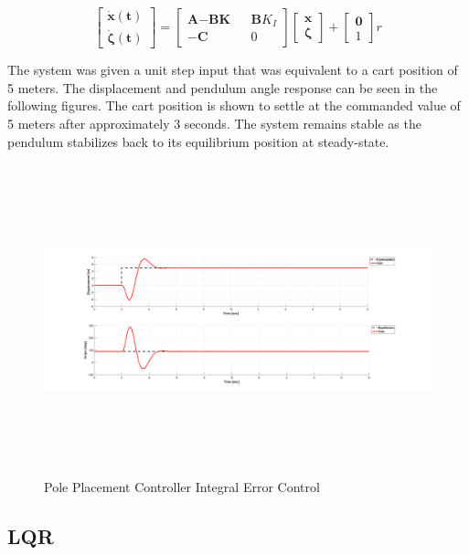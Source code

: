 \documentclass[titlepage]{article}
\begin{document}
\begin{equation}
\begin{bmatrix}
\mathbf{\dot x(t)} \\
\boldsymbol{\dot \zeta(t)}
\end{bmatrix}
=
\begin{bmatrix}
\textbf{A}-\textbf{BK} && \textbf{B}K_{I} \\
-\textbf{C} && 0
\end{bmatrix}
\begin{bmatrix}
\textbf{x} \\
\boldsymbol{\zeta}
\end{bmatrix}
+
\begin{bmatrix}
\textbf{0} \\ 1
\end{bmatrix}
r
\end{equation}

The system was given a unit step input that was equivalent to a cart position of 5 meters. The displacement and pendulum angle response can be seen in the following figures. The cart position is shown to settle at the commanded value of 5 meters after approximately 3 seconds. The system remains stable as the pendulum stabilizes back to its equilibrium position at steady-state.

\begin{figure}[H]
\center
\includegraphics[width=15cm, height=9cm]{pole_placement_integral_error.png}
\caption{Pole Placement Controller Integral Error Control}
\end{figure}

\subsection{LQR}
\end{document}
